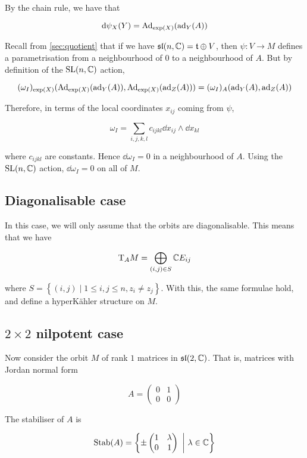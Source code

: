 \documentclass{article}
\renewcommand{\sl}{\mathfrak{sl}}
\begin{document}
By the chain rule, we have that

\[\dd\psi_X(Y) = \operatorname{Ad}_{\exp(X)}(\operatorname{ad}_Y(A))\]

Recall from \cref{sec:quotient} that if we have \(\sl(n, \C) = \mft \oplus V\), then \(\psi : V \to M\) defines a parametrisation from a neighbourhood of \(0\) to a neighbourhood of \(A\). But by definition of the \(\operatorname{SL}(n, \mathbb{C})\) action,

\[(\omega_I)_{\exp(X)}(\operatorname{Ad}_{\exp(X)}(\operatorname{ad}_Y(A)), \operatorname{Ad}_{\exp(X)}(\operatorname{ad}_Z(A))) = (\omega_I)_A(\operatorname{ad}_Y(A), \operatorname{ad}_Z(A))\]

Therefore, in terms of the local coordinates \(x_{ij}\) coming from \(\psi\),

\[\omega_I = \sum_{i, j, k, l}c_{ijkl}\dd x_{ij} \wedge \dd x_{kl}\]

where \(c_{ijkl}\) are constants. Hence \(\dd \omega_I = 0\) in a neighbourhood of \(A\). Using the \(\operatorname{SL}(n, \mathbb{C})\) action, \(\dd\omega_I = 0\) on all of \(M\).

\subsection{Diagonalisable case}

In this case, we will only assume that the orbits are diagonalisable. This means that we have

\[\mathrm{T}_AM = \bigoplus_{(i, j) \in S}\mathbb{C} E_{ij}\]

where \(S = \left\{(i, j) \mid 1 \le i, j \le n, z_i \ne z_j\right\}\). With this, the same formulae hold, and define a hyperK\"ahler structure on \(M\).

\subsection{\(2 \times 2\) nilpotent case}

Now consider the orbit \(M\) of rank \(1\) matrices in \(\sl(2, \C)\). That is, matrices with Jordan normal form

\[A = \begin{pmatrix}
    0 & 1 \\
    0 & 0
\end{pmatrix}\]

The stabiliser of \(A\) is 

\[\operatorname{Stab}(A) = \left\{\pm \begin{pmatrix}
    1 & \lambda \\
    0 & 1
\end{pmatrix}\ \bigg\vert\ \lambda \in \mathbb{C}\right\}\]
\end{document}
